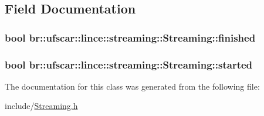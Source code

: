 \subsection{Field Documentation}
\hypertarget{classbr_1_1ufscar_1_1lince_1_1streaming_1_1Streaming_abe03b3af08b39a8389c4c70bc17e4663}{
\subsubsection[{finished}]{\setlength{\rightskip}{0pt plus 5cm}bool {\bf br::ufscar::lince::streaming::Streaming::finished}}}
\label{classbr_1_1ufscar_1_1lince_1_1streaming_1_1Streaming_abe03b3af08b39a8389c4c70bc17e4663}
\hypertarget{classbr_1_1ufscar_1_1lince_1_1streaming_1_1Streaming_a64e2c8f53657a4572993d665acfcf6f6}{
\subsubsection[{started}]{\setlength{\rightskip}{0pt plus 5cm}bool {\bf br::ufscar::lince::streaming::Streaming::started}}}
\label{classbr_1_1ufscar_1_1lince_1_1streaming_1_1Streaming_a64e2c8f53657a4572993d665acfcf6f6}


The documentation for this class was generated from the following file:\begin{DoxyCompactItemize}
\item 
include/\hyperlink{Streaming_8h}{Streaming.h}\end{DoxyCompactItemize}
